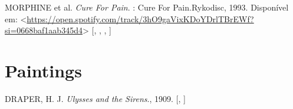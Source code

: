 \documentclass[
  10pt,
  oneside,
  cleardoublepage=empty,
  numbers=noenddot,
  titlepage,
  toclink=all,
  toc=bibliography,
  headinclude,
  footinclude]{scrbook}
\newlength{\cslhangindent}
\newenvironment{CSLReferences}[2] %
 {\begin{list}{}{%
  \setlength{\itemindent}{0pt}
  \setlength{\leftmargin}{0pt}
  \setlength{\parsep}{0pt}
  \ifodd #1
   \setlength{\leftmargin}{\cslhangindent}
   \setlength{\itemindent}{-1\cslhangindent}
  \fi
  \setlength{\itemsep}{#2\baselineskip}}}
 {\end{list}}
\theoremstyle{plain}
\theoremstyle{plain}
\theoremstyle{definition}
\theoremstyle{definition}
\theoremstyle{plain}
\theoremstyle{plain}
\theoremstyle{definition}
\theoremstyle{plain}
\theoremstyle{remark}
\begin{document}
\label{refs_songs}
\begin{CSLReferences}{0}{1}
MORPHINE et al. \emph{Cure For Pain}. : Cure For Pain.Rykodisc, 1993.
Disponível em:
\textless{}\url{https://open.spotify.com/track/3hO9gaVixKDoYDrlTBrEWf?si=0668baf1aab345d4}\textgreater{}
{[},
\hyperref[cite_2]{\pageref{cite_2}},
\hyperref[cite_3]{\pageref{cite_3}},
\hyperref[cite_4]{\pageref{cite_4}}{]}

\end{CSLReferences}

\section*{Paintings}\label{sec-paintings}

\label{refs_paintings}
\begin{CSLReferences}{0}{1}
DRAPER, H. J. \emph{Ulysses and the Sirens}., 1909.
{[},
\hyperref[cite_55]{\pageref{cite_55}}{]}

\end{CSLReferences}


\backmatter
\end{document}
